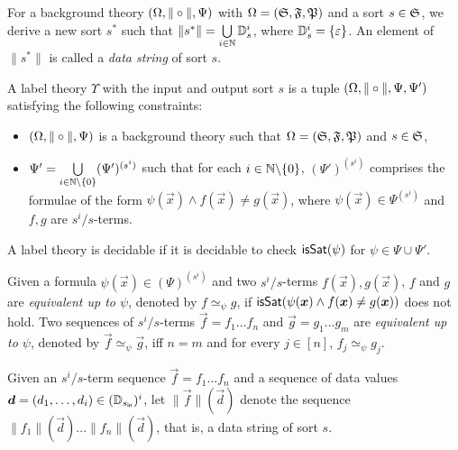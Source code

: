 For a background theory $(\Omega, \| \circ \|, \Psi)$ with $\Omega=({\mathfrak{S}}, {\mathfrak{F}}, {\mathfrak{P}})$ and a sort $s \in {\mathfrak{S}}$, we derive a new sort $s^*$ such that $\|s^* \| = \bigcup \limits_{i \in \mathbb{N}}\mathbb{D}_s^i$, where $\mathbb{D}^i_s = \{\varepsilon\}$. An element of $\|s^* \|$ is called a \emph{data string} of sort $s$.

\begin{definition}
A label theory  $\Upsilon$ with the input and output sort $s$ is a tuple $(\Omega, \| \circ \|, \Psi, \Psi')$ satisfying the following constraints:
\begin{itemize}
\item $(\Omega, \| \circ \|, \Psi)$ is a background theory such that $\Omega = ({\mathfrak{S}}, {\mathfrak{F}}, {\mathfrak{P}})$ and $s  \in {\mathfrak{S}}$,
%
\item $\Psi' = \bigcup \limits_{i \in \mathbb{N} \backslash \{0\}} (\Psi')^{(s^i)}$ such that for each $i \in \mathbb{N} \backslash \{0\}$, $ (\Psi')^{(s^i)}$ comprises the formulae of the form $\psi(\vec{x}) \wedge f(\vec{x}) \neq g(\vec{x})$, where $\psi(\vec{x}) \in \Psi^{(s^i)}$ and $f, g $ are $s^i/s$-terms.
\end{itemize}
A label theory is decidable if it is decidable to check $\mathsf{isSat}(\psi)$ for $\psi \in \Psi \cup \Psi'$.
\end{definition}

Given a formula $\psi(\vec{x}) \in (\Psi)^{(s^i)}$ and two $s^i /s$-terms $f(\vec{x}), g(\vec{x})$,
$f$ and $g$ are \emph{equivalent up to $\psi$}, denoted by $f \simeq_\psi g$, if
 $\issat(\psi(\vec{x}) \wedge f(\vec{x}) \neq g(\vec{x}))$ does not hold.
Two sequences of $s^i/ s$-terms $\vec{f}=f_1...f_n$ and $\vec{g}=g_1...g_m$ are \emph{equivalent up to $\psi$}, denoted by $\vec{f}\simeq_\psi \vec{g}$,
iff $n=m$ and for every $j \in [n]$, $f_j \simeq_\psi g_j$.

Given an $s^i/ s$-term sequence $\vec{f}=f_1...f_n$ and a sequence of data values $\vec{d} = (d_1, \dots, d_i) \in (\data_{s_{\sf in}})^i$,
let $\|\vec{f}\|(\vec{d})$ denote the sequence $\|f_1\|(\vec{d})...\|f_n\|(\vec{d})$, that is, a data string of sort $s$.

